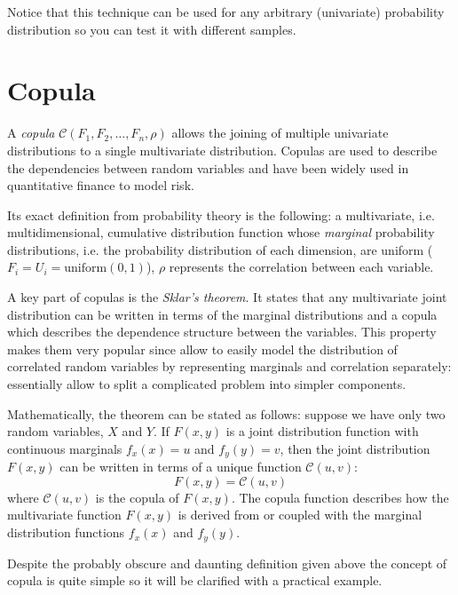 Notice that this technique can be used for any arbitrary (univariate) probability distribution so you can test it with different samples. 

\section{Copula}
\label{copula}

A \emph{copula} $\mathcal{C}(F_1, F_2, \ldots, F_n, \rho)$ allows the joining of multiple univariate distributions to a single multivariate distribution. Copulas are used to describe the dependencies between random variables and have been widely used in quantitative finance to model risk. 

Its exact definition from probability theory is the following: a multivariate, i.e. multidimensional, cumulative distribution function whose \emph{marginal} probability distributions, i.e. the probability distribution of each dimension, are uniform ($F_i = U_i =\mathrm{uniform}(0,1)$), $\rho$ represents the correlation between each variable.

A key part of copulas is the \emph{Sklar’s theorem}. It states that any multivariate joint distribution can be written in terms of the marginal distributions and a copula which describes the dependence structure between the variables. This property makes them very popular since allow to easily model the distribution of correlated random variables by representing marginals and correlation separately: essentially allow to split a complicated problem into simpler components.

\begin{attention}
Mathematically, the theorem can be stated as follows: suppose we have only two random variables, $X$ and $Y$. If $F(x,y)$ is a joint distribution function with continuous marginals $f_x(x)=u$ and $f_y(y)=v$, then the joint distribution $F(x,y)$ can be written in terms of a unique function $\mathcal{C}(u,v)$:
\begin{equation}
F(x,y)=\mathcal{C}(u,v)
\end{equation}
\noindent
where $\mathcal{C}(u,v)$ is the copula of $F(x,y)$.
The copula function describes how the multivariate function $F(x,y)$ is derived from or coupled with the marginal distribution functions $f_x(x)$ and $f_y(y)$.
\end{attention}

Despite the probably obscure and daunting definition given above the concept of copula is quite simple so it will be clarified with a practical example.

